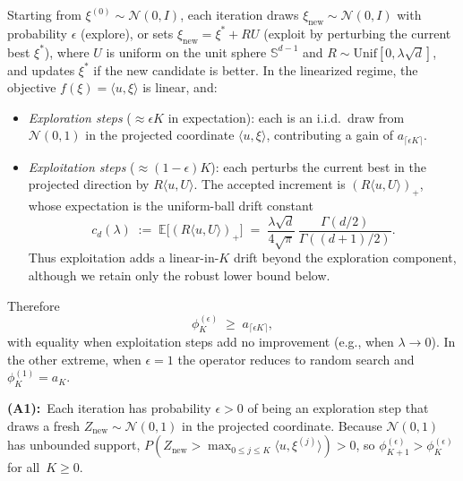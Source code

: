 \begin{example}
\label{ex:eps-greedy}
Starting from $\xi^{(0)}\sim\mathcal{N}(0,I)$, each iteration
draws $\xi_{\mathrm{new}}\sim\mathcal{N}(0,I)$ with probability
$\epsilon$ (explore), or sets
$\xi_{\mathrm{new}}=\xi^*+RU$ (exploit by perturbing the current best
$\xi^*$), where $U$ is uniform on the unit sphere $\mathbb{S}^{d-1}$ and
$R\sim\mathrm{Unif}[0,\lambda\sqrt d]$, and updates $\xi^*$ if the new
candidate is better.
In the linearized regime, the objective
$f(\xi)=\langle u,\xi\rangle$ is linear, and:
\begin{itemize}
  \item \emph{Exploration steps} ($\approx\epsilon K$ in expectation):
    each is an i.i.d.\ draw from $\mathcal{N}(0,1)$ in the projected
    coordinate $\langle u,\xi\rangle$, contributing a gain of
    $a_{\lceil\epsilon K\rceil}$.
  \item \emph{Exploitation steps} ($\approx(1{-}\epsilon)K$):
    each perturbs the current best in the projected direction by
    $R\langle u,U\rangle$.
    The accepted increment is $(R\langle u,U\rangle)_+$, whose
    expectation is the uniform-ball drift constant
    \begin{equation}
      c_d(\lambda)
      \;:=\;
      \mathbb{E}\bigl[(R\langle u,U\rangle)_+\bigr]
      \;=\;
      \frac{\lambda\sqrt d}{4\sqrt{\pi}}\,
      \frac{\Gamma(d/2)}{\Gamma((d+1)/2)}.
      \label{eq:uniform-ball-drift}
    \end{equation}
    Thus exploitation adds a linear-in-$K$ drift beyond the
    exploration component, although we retain only the robust lower
    bound below.
\end{itemize}
Therefore
\begin{equation}
  \phi_K^{(\epsilon)}
  \;\ge\; a_{\lceil\epsilon K\rceil},
  \label{eq:phi-epsgreedy-lb}
\end{equation}
with equality when exploitation steps add no improvement
(e.g., when $\lambda\to 0$).
In the other extreme, when $\epsilon=1$ the operator
reduces to random search and $\phi_K^{(1)}=a_K$.

\textbf{(A1):}~Each iteration has probability $\epsilon>0$ of being
an exploration step that draws a fresh
$Z_{\mathrm{new}}\sim\mathcal{N}(0,1)$ in the projected coordinate.
Because $\mathcal{N}(0,1)$ has unbounded support,
$P(Z_{\mathrm{new}}>\max_{0\le j\le K}\langle u,\xi^{(j)}\rangle)>0$,
so $\phi_{K+1}^{(\epsilon)}>\phi_K^{(\epsilon)}$ for all~$K\ge 0$.


\end{example}
